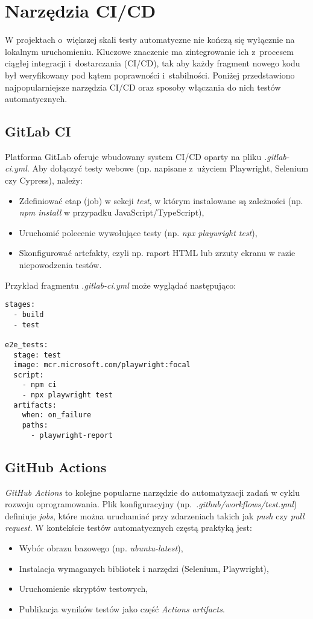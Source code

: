 \documentclass[12pt]{report}
\begin{document}
\section{Narzędzia CI/CD}
\label{sec:narzedzia-ci-cd}
W projektach o~większej skali testy automatyczne nie kończą się wyłącznie na lokalnym uruchomieniu. Kluczowe znaczenie ma zintegrowanie ich z~procesem ciągłej integracji i~dostarczania (CI/CD), tak aby każdy fragment nowego kodu był weryfikowany pod kątem poprawności i~stabilności. Poniżej przedstawiono najpopularniejsze narzędzia CI/CD oraz sposoby włączania do nich testów automatycznych.

\subsection*{GitLab CI}
Platforma GitLab oferuje wbudowany system CI/CD oparty na pliku \emph{.gitlab-ci.yml}. Aby dołączyć testy webowe (np. napisane z~użyciem Playwright, Selenium czy Cypress), należy:
\begin{itemize}
    \item Zdefiniować etap (job) w sekcji \emph{test}, w którym instalowane są zależności (np. \emph{npm install} w przypadku JavaScript/TypeScript),
    \item Uruchomić polecenie wywołujące testy (np. \emph{npx playwright test}),
    \item Skonfigurować artefakty, czyli np. raport HTML lub zrzuty ekranu w razie niepowodzenia testów.
\end{itemize}
Przykład fragmentu \emph{.gitlab-ci.yml} może wyglądać następująco:
\begin{verbatim}
stages:
  - build
  - test

e2e_tests:
  stage: test
  image: mcr.microsoft.com/playwright:focal
  script:
    - npm ci
    - npx playwright test
  artifacts:
    when: on_failure
    paths:
      - playwright-report
\end{verbatim}

\subsection*{GitHub Actions}
\emph{GitHub Actions} to kolejne popularne narzędzie do automatyzacji zadań w cyklu rozwoju oprogramowania. Plik konfiguracyjny (np.~\emph{.github/workflows/test.yml}) definiuje \emph{jobs}, które można uruchamiać przy zdarzeniach takich jak \emph{push} czy \emph{pull request}. W kontekście testów automatycznych częstą praktyką jest:
\begin{itemize}
    \item Wybór obrazu bazowego (np. \emph{ubuntu-latest}),
    \item Instalacja wymaganych bibliotek i narzędzi (Selenium, Playwright),
    \item Uruchomienie skryptów testowych,
    \item Publikacja wyników testów jako część \emph{Actions artifacts}.
\end{itemize}
\end{document}
